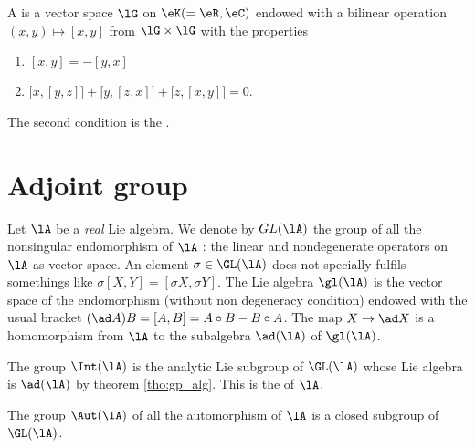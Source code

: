 

\begin{definition}
    A  is a vector space \( \lG\) on \( \eK(=\eR,\eC)\) endowed with a bilinear operation \( (x,y)\mapsto [x,y]\) from \( \lG\times\lG\) with the properties
    \begin{enumerate}
        \item
            \( [x,y]=-[y,x]\)
        \item
            \( \big[ x,[y,z] \big]+\big[ y,[z,x] \big]+\big[ z,[x,y] \big]=0\).
    \end{enumerate}
    The second condition is the .
\end{definition}

\section{Adjoint group}\label{sec:adj_gp}

Let $\lA$ be a \emph{real} Lie algebra. We denote by $GL(\lA)$ the group of all the nonsingular endomorphism of $\lA$ : the linear and nondegenerate operators on $\lA$ as vector space. An element $\sigma\in\GL(\lA)$ does not specially fulfils somethings like $\sigma[X,Y]=[\sigma X,\sigma Y]$. The Lie algebra $\gl(\lA)$ is the vector space of the endomorphism (without non degeneracy condition) endowed with the usual bracket $(\ad A)B=[A,B]=A\circ B-B\circ A$. The map $X\to\ad X$ is a homomorphism from $\lA$ to the subalgebra $\ad(\lA)$ of $\gl(\lA)$.

The group $\Int(\lA)$ is the analytic Lie subgroup of $\GL(\lA)$ whose Lie algebra is $\ad(\lA)$ by theorem \ref{tho:gp_alg}. This is the  of $\lA$.

\begin{proposition}
The group $\Aut(\lA)$ of all the automorphism of $\lA$ is a closed subgroup of $\GL(\lA)$.
\end{proposition}

